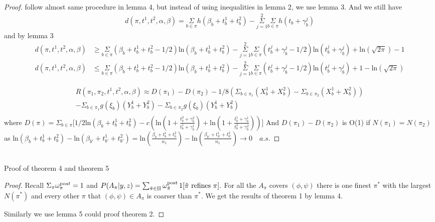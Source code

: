 \documentclass[aoas,preprint]{imsart}
\begin{document}
\begin{proof}
follow almost same procedure in lemma 4, but instead of using inequalities in lemma 2, we use lemma 3. And we still have
\begin{eqnarray*}
d(\pi, t^1, t^2, \alpha, \beta) = \underset{b\in \pi}\Sigma h(\beta_b + t_b^1 + t_b^2) - \overset{2}{\underset{j = 1}{\Sigma}} \underset{b\in \pi}\Sigma h(t_b + \gamma_b^j)
\end{eqnarray*}
and by lemma 3
\begin{align}
d(\pi, t^1, t^2, \alpha, \beta) &\geq \underset{b\in \pi}\Sigma (\beta_b + t_b^1 + t_b^2 - 1/2) \text{ln}(\beta_b  + t_b^1 + t_b^2) - \overset{2}{\underset{j = 1}{\Sigma}}\underset{b\in\pi}\Sigma (t_b^j + \gamma_b^j - 1/2) \text{ln}(t_b^j + \gamma_b^j) + \text{ln}(\sqrt{2\pi}) - 1\\
d(\pi, t^1, t^2, \alpha, \beta) &\leq \underset{b\in \pi}\Sigma (\beta_b + t_b^1 + t_b^2 - 1/2) \text{ln}(\beta_b  + t_b^1 + t_b^2) - \overset{2}{\underset{j = 1}{\Sigma}}\underset{b\in\pi}\Sigma (t_b^j + \gamma_b^j - 1/2) \text{ln}(t_b^j + \gamma_b^j) + 1 - \text{ln}(\sqrt{2\pi})
\end{align}

\begin{eqnarray*}
R(\pi_1, \pi_2, t^1, t^2, \alpha, \beta)  \approx D(\pi_1) - D(\pi_2) - 1/8 (\Sigma_{b\in\pi_1}(X_b^1 + X_b^2) - \Sigma_{b\in\pi_2}(X_b^1 + X_b^2)) \\ 
 - \Sigma_{b\in\pi_1}g(\xi_b)(Y_b^1 + Y_b^2)  - \Sigma_{b\in\pi_2}g(\xi_ b)(Y_b^1 + Y_b^2)\\
\end{eqnarray*}
where $D(\pi) = \Sigma_{b\in\pi}\big[1/2 \text{ln}(\beta_b + t_b^1 + t_b^2) 
  - c(\text{ln}(1 + \frac{t_b^2 + \gamma_b^2}{t_b^1 + \gamma_b^1}) + \text{ln}(1 + \frac{t_b^1 + \gamma_b^1}{t_b^2 + \gamma_b^2}))\big]$
And $D(\pi_1) - D(\pi_2)$ is O(1) if $N(\pi_1) = N(\pi_2)$ as $ \text{ln}(\beta_b + t_b^1 + t_b^2)  -  \text{ln}(\beta_{b'} + t_{b'}^1 + t_{b'}^2) =  \text{ln}(\frac{\beta_b + t_b^1 + t_b^2}{n_1})  -  \text{ln}(\frac{\beta_{b'} + t_{b'}^1 + t_{b'}^2}{n_1}) \rightarrow 0 \quad a.s.$


\end{proof}



\hfill\\
Proof of theorem 4 and theorem 5
\begin{proof}

Recall $\Sigma_\pi \omega_\pi^{\text post} = 1$ and $P(A_\pi|y,z) = 
\sum_{\tilde \pi \in \Pi} \omega^{\rm post}_{\tilde \pi} \,  1[ {\mbox {\rm $\tilde \pi$ refines $\pi$}} ].$  For all the $A_\pi$ covers $(\phi, \psi)$ there is one finest $\pi^*$ with the largest $N(\pi^*)$ and every other $\pi$ that $(\phi,\psi) \in A_\pi$ is coarser than $\pi^*$. We get the results of theorem 1 by lemma 4.

Similarly we use lemma 5 could proof theorem 2. 

\end{proof}
\end{document}
